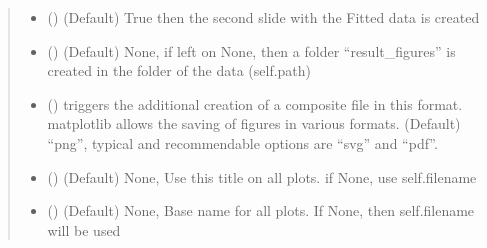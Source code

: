 \documentclass[letterpaper,10pt,english]{sphinxmanual}
\begin{document}
\begin{fulllineitems}
\begin{fulllineitems}
\begin{quote}
\begin{description}
\begin{itemize}
\item {} 
 (\sphinxstyleliteralemphasis{\sphinxupquote{, }}) \textendash{} (Default) True then the second slide with the Fitted data is created

\item {} 
 (\sphinxstyleliteralemphasis{\sphinxupquote{, }}\sphinxstyleliteralemphasis{\sphinxupquote{, }}) \textendash{} (Default) None, if left on None, then a folder “result\_figures” is created in the folder
of the data (self.path)

\item {} 
 (\sphinxstyleliteralemphasis{\sphinxupquote{ (}}\sphinxstyleliteralemphasis{\sphinxupquote{)}}\sphinxstyleliteralemphasis{\sphinxupquote{, }}) \textendash{} triggers the additional creation of a composite file in this format.
matplotlib allows the saving of figures in various formats. (Default) “png”,
typical and recommendable options are “svg” and “pdf”.

\item {} 
 (\sphinxstyleliteralemphasis{\sphinxupquote{, }}) \textendash{} (Default) None, Use this title on all plots. if None, use self.filename

\item {} 
 (\sphinxstyleliteralemphasis{\sphinxupquote{, }}) \textendash{} (Default) None, Base name for all plots. If None, then self.filename will be used


\end{itemize}
\end{description}
\end{quote}
\end{fulllineitems}
\end{fulllineitems}
\end{document}
